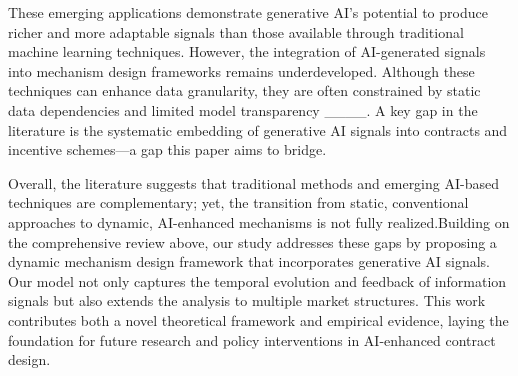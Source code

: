 These emerging applications demonstrate generative AI's potential to produce richer and more adaptable signals than those available through traditional machine learning techniques. However, the integration of AI-generated signals into mechanism design frameworks remains underdeveloped. Although these techniques can enhance data granularity, they are often constrained by static data dependencies and limited model transparency ____. A key gap in the literature is the systematic embedding of generative AI signals into contracts and incentive schemes—a gap this paper aims to bridge.

Overall, the literature suggests that traditional methods and emerging AI-based techniques are complementary; yet, the transition from static, conventional approaches to dynamic, AI-enhanced mechanisms is not fully realized.Building on the comprehensive review above, our study addresses these gaps by proposing a dynamic mechanism design framework that incorporates generative AI signals. Our model not only captures the temporal evolution and feedback of information signals but also extends the analysis to multiple market structures. This work contributes both a novel theoretical framework and empirical evidence, laying the foundation for future research and policy interventions in AI-enhanced contract design.